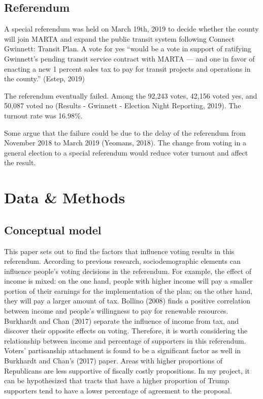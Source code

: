 \documentclass[
]{article}
\begin{document}
\hypertarget{referendum}{%
\subsection{Referendum}\label{referendum}}

A special referendum was held on March 19th, 2019 to decide whether the
county will join MARTA and expand the public transit system following
Connect Gwinnett: Transit Plan. A vote for yes ``would be a vote in
support of ratifying Gwinnett's pending transit service contract with
MARTA --- and one in favor of enacting a new 1 percent sales tax to pay
for transit projects and operations in the county.'' (Estep, 2019)

The referendum eventually failed. Among the 92,243 votes, 42,156 voted
yes, and 50,087 voted no (Results - Gwinnett - Election Night Reporting,
2019). The turnout rate was 16.98\%.

Some argue that the failure could be due to the delay of the referendum
from November 2018 to March 2019 (Yeomans, 2018). The change from voting
in a general election to a special referendum would reduce voter turnout
and affect the result.

\hypertarget{data-methods}{%
\section{Data \& Methods}\label{data-methods}}

\hypertarget{conceptual-model}{%
\subsection{Conceptual model}\label{conceptual-model}}

This paper sets out to find the factors that influence voting results in
this referendum. According to previous research, sociodemographic
elements can influence people's voting decisions in the referendum. For
example, the effect of income is mixed: on the one hand, people with
higher income will pay a smaller portion of their earnings for the
implementation of the plan; on the other hand, they will pay a larger
amount of tax. Bollino (2008) finds a positive correlation between
income and people's willingness to pay for renewable resources.
Burkhardt and Chan (2017) separate the influence of income from tax, and
discover their opposite effects on voting. Therefore, it is worth
considering the relationship between income and percentage of supporters
in this referendum. Voters' partisanship attachment is found to be a
significant factor as well in Burkhardt and Chan's (2017) paper. Areas
with higher proportions of Republicans are less supportive of fiscally
costly propositions. In my project, it can be hypothesized that tracts
that have a higher proportion of Trump supporters tend to have a lower
percentage of agreement to the proposal.
\end{document}
